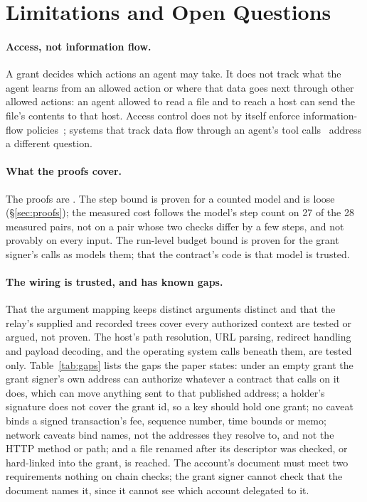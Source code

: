 \section{Limitations and Open Questions}\label{sec:limits}

\paragraph{Access, not information flow.} A grant decides which actions an
agent may take. It does not track what the agent learns from an allowed action
or where that data goes next through other allowed actions: an agent allowed
to read a file and to reach a host can send the file's contents to that host.
Access control does not by itself enforce information-flow
policies~\cite{sabelfeld}; systems that track data flow through an agent's
tool calls~\cite{camel,fides} address a different question.

\paragraph{What the proofs cover.} The proofs are \translationtrust. The step
bound is proven for a counted model and is loose (\S\ref{sec:proofs}); the
measured cost follows the model's step count on 27 of the 28 measured pairs,
not on a pair whose two checks differ by a few steps, and not provably on
every input. The run-level budget
bound is proven for the grant signer's calls as  models
them; that the contract's code is that model is
trusted.

\paragraph{The wiring is trusted, and has known gaps.} That the argument
mapping keeps distinct arguments distinct and that the
relay's supplied and recorded trees cover every authorized
context are tested or argued, not proven. The host's path
resolution, URL parsing, redirect handling and payload decoding, and the
operating system calls beneath them, are tested only. Table~\ref{tab:gaps}
lists the gaps the paper states: under an empty grant the grant signer's own
address can authorize whatever a contract that calls  on
it does, which can move anything sent to that published address; a holder's signature
does not cover the grant id, so a key should hold one grant; no caveat binds
a signed transaction's fee, sequence number, time bounds or memo; network
caveats bind names, not the addresses they resolve to, and not the HTTP
method or path; and a file renamed after its descriptor was checked, or
hard-linked into the grant, is reached. The account's document must meet two
requirements nothing on chain checks; the grant
signer cannot check that the document names it, since it cannot see which
account delegated to it.

